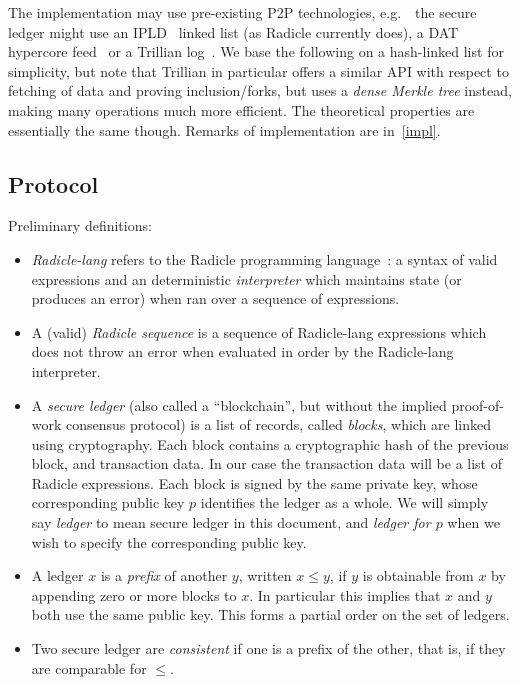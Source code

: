 \documentclass[a4paper, oneside, 10pt]{amsart}
\newcommand*\eg{e.g.\ }
\begin{document}
The implementation may use pre-existing P2P technologies, \eg~the secure ledger
might use an IPLD~\cite{ipld} linked list (as Radicle currently does), a DAT
hypercore feed~\cite{dat} or a Trillian log~\cite{trillian}. We base the
following on a hash-linked list for simplicity, but note that Trillian in
particular offers a similar API with respect to fetching of data and proving
inclusion/forks, but uses a \emph{dense Merkle tree} instead, making many
operations much more efficient. The theoretical properties are essentially the
same though. Remarks of implementation are in~\ref{impl}.

\subsection{Protocol}

Preliminary definitions:
\begin{itemize}
\item
  \emph{Radicle-lang} refers to the Radicle programming language~\cite{radicle}:
  a syntax of valid expressions and an deterministic \emph{interpreter} which
  maintains state (or produces an error) when ran over a sequence of
  expressions.
\item
  A (valid) \emph{Radicle sequence} is a sequence of Radicle-lang expressions
  which does not throw an error when evaluated in order by the Radicle-lang
  interpreter.
\item
  A \emph{secure ledger} (also called a ``blockchain'', but without the implied
  proof-of-work consensus protocol) is a list of records, called \emph{blocks},
  which are linked using cryptography. Each block contains a cryptographic hash
  of the previous block, and transaction data. In our case the transaction data
  will be a list of Radicle expressions. Each block is signed by the same
  private key, whose corresponding public key $p$ identifies the ledger as a
  whole. We will simply say \emph{ledger} to mean secure ledger in this
  document, and \emph{ledger for $p$} when we wish to specify the corresponding
  public key.
\item
  A ledger $x$ is a \emph{prefix} of another $y$, written $x \leq y$, if $y$ is
  obtainable from $x$ by appending zero or more blocks to $x$. In particular
  this implies that $x$ and $y$ both use the same public key. This forms a
  partial order on the set of ledgers.
\item Two secure ledger are \emph{consistent} if one is a prefix of the other,
  that is, if they are comparable for $\leq$.
\end{itemize}
\end{document}
